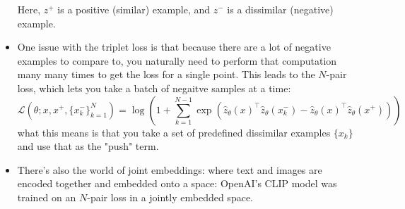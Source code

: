 \begin{itemize}
		Here, \( z^{+} \) is a positive (similar) example, and \( z^{-} \) is a dissimilar (negative)
		example.  


	\item One issue with the triplet loss is that because there are a lot of negative examples to compare to,
		you naturally need to perform that computation many many times to get the loss for a single point.
		This leads to the \( N \)-pair loss, which lets you take a batch of negaitve samples at a time:
		\[
			\mathcal{L}(\theta; x, x^{+}, \{x_k^{-}\}_{k = 1}^{N}) = \log\left( 1 + \sum_{k = 1}^{N -
			1}\exp\left( \hat{z}_\theta(x)^{\top} \hat{z}_\theta(x_k^{-}) - \hat{z}_\theta(x)^{\top}
			\hat{z}_\theta (x^{+}) \right) \right)
		\]
		what this means is that you take a set of predefined dissimilar examples \( \{x_k\} \) and use that
		as the "push" term. 


	\item There's also the world of joint embeddings: where text and images are encoded together and embedded
		onto a space: OpenAI's CLIP model was trained on an \( N \)-pair loss in a jointly embedded space.  
\end{itemize}
